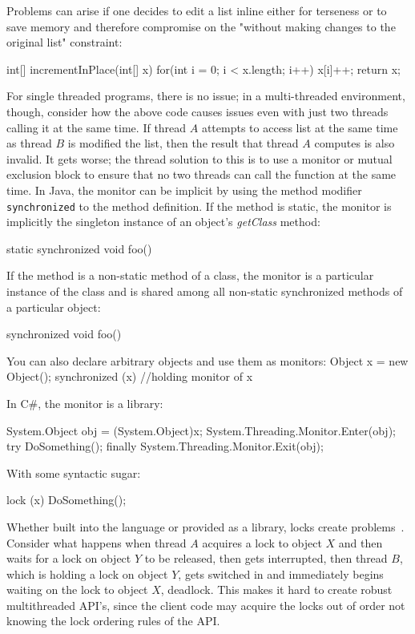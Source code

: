 Problems can arise if one decides to edit a list inline either for terseness or to save memory and therefore compromise on the 
"without making changes to the original list" constraint: 

int[] incrementInPlace(int[] x) {
	for(int i = 0; i < x.length; i++) { 
	  x[i]++;
         }
         return x;
}

For single threaded programs, there is no issue; in a multi-threaded environment, though, consider how the above code
causes issues even with just two threads calling it at the same time. 
If thread $A$ attempts to access list at the same time as thread $B$ is modified the list, then the result
that thread $A$ computes is also invalid. 
It gets worse; the thread solution to this is to use a monitor or mutual exclusion block to
ensure that no two threads can call the function at the same time. 
In Java, the monitor can be implicit by using the method modifier {\tt synchronized} to the method definition. 
If the method is static, the monitor is implicitly the singleton instance of an object's {\it getClass} method:

static synchronized void foo() { }

If the method is a non-static method of a class, the monitor is a 
particular instance of the class and is shared among all non-static synchronized methods of a particular object:

synchronized void foo() { }

You can also declare arbitrary objects and use them as monitors:
Object x = new Object();
synchronized (x) {
 //holding monitor of x
}

In C\#, the monitor is a library:
 
System.Object obj = (System.Object)x;
System.Threading.Monitor.Enter(obj);
try
{
    DoSomething();
}
finally
{
    System.Threading.Monitor.Exit(obj);
} 

With some syntactic sugar:

lock (x)
{
    DoSomething();
}

Whether built into the language or provided as a library, locks create problems~\cite{problemsWithThreads}.
Consider what happens when thread $A$ acquires a lock to object $X$ and then waits for
a lock on object $Y$ to be released, then gets interrupted, then thread $B$, which is holding a lock
on object $Y$, gets switched in and immediately begins waiting on the lock to object $X$, deadlock.
This makes it hard to create robust multithreaded API's, since the client code may acquire the locks out of order not
knowing the lock ordering rules of the API. 

